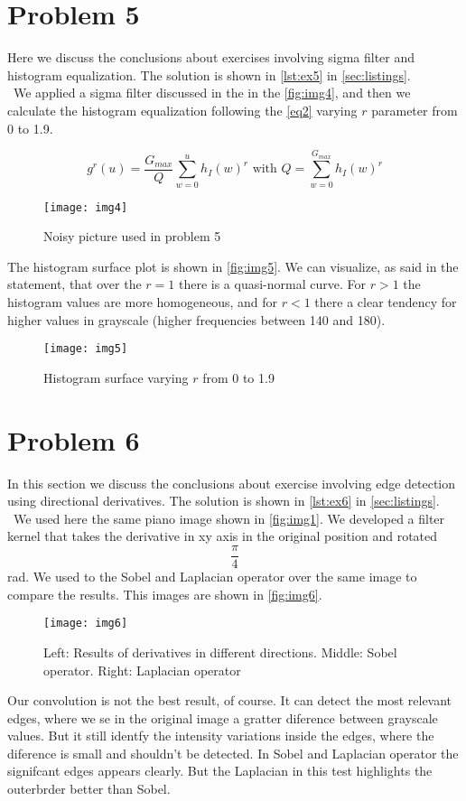 \documentclass[a4paper,10pt]{article}
\begin{document}
\section{Problem 5}
Here we discuss the conclusions about exercises involving sigma filter and histogram equalization. 
The solution is shown in \autoref{lst:ex5} in \autoref{sec:listings}. \\\
We applied a sigma filter discussed in the \cite[p. 58]{Klette:Concise_Computer_Vision} in the \autoref{fig:img4}, 
and then we calculate the histogram equalization following the \autoref{eq2} varying $r$ parameter from 0 to 1.9.

\begin{equation}
 \label{eq2}
 g^{r}(u) = \frac{G_{max}}{Q}\sum_{w=0}^{u}h_I(w)^r  \text{ with }
 Q = \sum_{w=0}^{G_{max}} h_I(w)^r
\end{equation}

\begin{figure}[H]
 \centering
 \caption{Noisy picture used in problem 5}
 \label{fig:img4}
 \texttt{[image: img4]}
\end{figure}

The histogram surface plot is shown in \autoref{fig:img5}. We can visualize, as said in the statement, 
that over the $r = 1$ there is a quasi-normal curve. 
For $r > 1$ the histogram values are more homogeneous, and for $r < 1$ there a clear tendency 
for higher values in grayscale (higher frequencies between 140 and 180).

\begin{figure}[H]
 \centering
 \caption{Histogram surface varying $r$ from 0 to 1.9}
 \label{fig:img5}
 \texttt{[image: img5]}
\end{figure}

\section{Problem 6}
In this section we discuss the conclusions about exercise involving edge detection using directional derivatives. 
The solution is shown in \autoref{lst:ex6} in \autoref{sec:listings}. \\\
We used here the same piano image shown in \autoref{fig:img1}. We developed a filter kernel that takes the derivative
in xy axis in the original position and rotated $$\frac{\pi}{4}$$ rad. We used to the Sobel and Laplacian operator
over the same image to compare the results. This images are shown in \autoref{fig:img6}.

\begin{figure}[H]
 \centering
 \caption{Left: Results of derivatives in different directions. Middle: Sobel operator. Right: Laplacian operator}
 \label{fig:img6}
 \texttt{[image: img6]}
\end{figure}
Our convolution is not the best result, of course. It can detect the most relevant edges, where we se in the original image a gratter
diference between grayscale values. But it still identfy the intensity variations inside the edges, where the diference is small and
shouldn't be detected. In Sobel and Laplacian operator the signifcant edges appears clearly. But the Laplacian in this test highlights 
the outerbrder better than Sobel.
\end{document}

